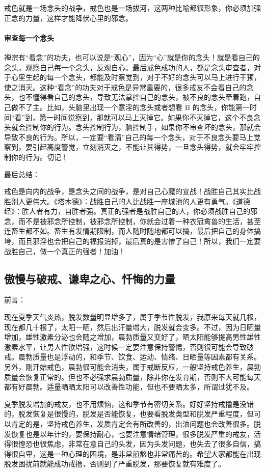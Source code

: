 戒色就是一场念头的战争，戒色也是一场拔河，这两种比喻都很形象，你必须加强正念的力量，这样才能降伏心里的邪念。

\paragraph{审查每一个念头} 禅宗有“看念”的功夫，也可以说是“观心”，因为“心”就是你的念头！就是看自己的念头，观察自己每一个念头，反观自心。最后戒色成功的人，都是念头审查者，对于心里生起的每一个念头，都能及时察觉到，对于不好的念头可以马上进行干预，使之消灭。这种“看念”的功夫对于戒色是异常重要的，很多戒友不会看自己的念头，也不懂得看自己的念头，导致无法掌控自己的念头，被不良的念头牵着跑，自己做不了主。比如，头脑里出现一个意淫的念头或者想看 H 的念头，你能第一时间“看”到，第一时间觉察到，那就可以马上灭掉它。如果你不灭掉它，这个不良念头就会控制你的行为。念头控制行为，脑控制手，如果你不审查坏的念头，那就会导致不良的行为。所以，一定要“看清”自己的每一个念头，对于不良念头要马上觉察到，要引起高度警觉，立刻消灭之，不能让其得势，一旦念头得势，就会牢牢控制你的行为。切记！

最后总结：

戒色是向内的战争，是念头之间的战争，是对自己心魔的宣战！战胜自己其实比战胜别人更伟大。《塔木德》：战胜自己的人比战胜一座城池的人更有勇气。《道德经》：胜人者有力，自胜者强。真正的强者是战胜自己的人，你必须战胜自己的邪念，而不是被邪念所控制，被邪念所控制，你就会过着一种衣冠禽兽的生活，甚至连畜生都不如。畜生有发情期限制，而人随时随地都可以搞，最后把自己的身体搞垮，而且邪淫也会把自己的福报消掉，最后真的是害惨了自己！所以，我们一定要战胜自己，做一个真正的强者！加油！

\subsection{傲慢与破戒、谦卑之心、忏悔的力量}

前言：

现在夏季天气炎热，脱发数量明显增多了，属于季节性脱发，我原来每天就几根，现在都几十根了，太阳一晒，然后出汗量增大，脱发就会变多。不过，因为日晒量增加，雄性激素分泌也会随之增加，晨勃质量又变好了，晒太阳能够提高男性雄性激素水平，让男人性欲增强，这时候一定要注意保持警惕，否则很可能会导致破戒。晨勃质量也是浮动的，和季节、饮食、运动、情绪、日晒量等因素都有关系。另外，刚开始戒色，晨勃很可能会消失，属于戒断反应，一般坚持戒色养生，晨勃质量会恢复正常的。但也不必强求晨勃质量，除非你在发育期，否则不大可能每天都有好晨勃。适量晒晒太阳可以改善性功能，但也不要晒太多，所谓过犹不及。

夏季脱发增加的戒友，也不用烦恼，这和季节有密切关系。好好坚持戒撸是没错的，脱发恢复是很慢的，脱发是否能恢复，也要看脱发类型和脱发严重程度，但可以肯定的是，坚持戒色养生，发质肯定会有所改善的，出油问题也会改善很多。脱发恢复也是以年计的，要保持耐心，也要注意情绪管理，很多脱发严重的戒友，活得很惶恐也很焦虑，非常在意自己的头发，因为头发问题，也失去了很多自信，搞得很自卑，这是一种心理的困境，是非常煎熬也非常痛苦的。希望大家都能在出现脱发困扰前就能成功戒撸，否则到了严重脱发，那要恢复就有难度了。

